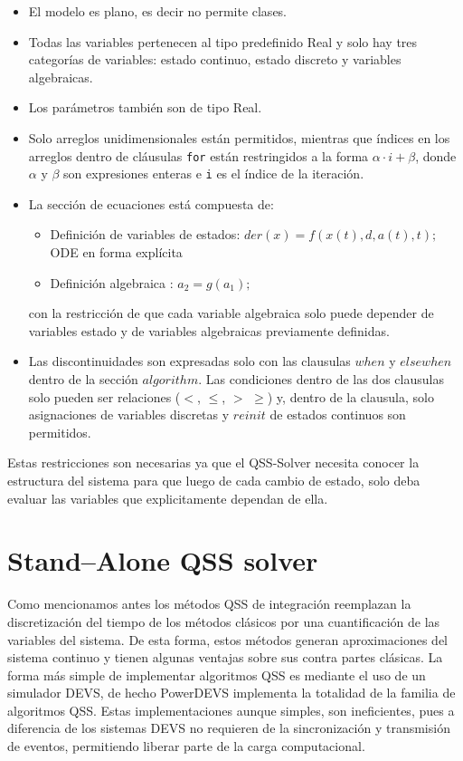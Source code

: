 	\begin{itemize}
	 \item El modelo es plano, es decir no permite clases.
	 \item Todas las variables pertenecen al tipo predefinido Real y solo hay tres categorías de variables: estado continuo, estado discreto y variables 
	algebraicas.
	 \item Los parámetros también son de tipo Real. 
	 \item 
     
    Solo arreglos unidimensionales están permitidos, mientras que índices en los arreglos dentro de cláusulas \texttt{for} están restringidos a la forma $\alpha \cdot i + \beta$, 
	donde $\alpha$ y $\beta$ son expresiones enteras e \texttt{i} es el índice de la iteración.
	 \item La sección de ecuaciones está compuesta de:
	 \begin{itemize}
		\item Definición de variables de estados: $der(x) =  f (x(t), d, a(t), t);$ ODE en forma explícita
		\item Definición algebraica : $a_2  = g(a_1);$
	 \end{itemize}
	 con la restricción de que cada variable algebraica solo puede depender de variables estado y de variables algebraicas previamente definidas.
	 
	 \item Las discontinuidades son expresadas solo con las clausulas $when$ y $elsewhen$ dentro de la sección $algorithm$. Las condiciones dentro de las dos 
	clausulas solo pueden ser relaciones ($<$, $\leqslant$, $>$ $\geqslant$) y, dentro de la clausula, solo asignaciones de variables discretas y $reinit$ 
	de estados continuos son permitidos.
	\end{itemize}

	Estas restricciones son necesarias ya que el QSS-Solver necesita conocer la estructura del sistema para que luego de cada cambio de estado, solo deba evaluar
	las variables que explicitamente dependan de ella.

\section{Stand–Alone QSS solver}
	Como mencionamos antes los métodos QSS de integración reemplazan la discretización del tiempo de los métodos clásicos por una cuantificación de las 
	variables del sistema. De esta forma, estos métodos generan aproximaciones del sistema continuo y tienen algunas ventajas sobre sus contra partes clásicas.
	La forma más simple de implementar algoritmos QSS es mediante el uso de un simulador DEVS, de hecho PowerDEVS implementa la totalidad de la familia de 
	algoritmos QSS. Estas implementaciones aunque simples, son ineficientes, pues a diferencia de los sistemas DEVS no requieren de la sincronización y 
	transmisión de eventos, permitiendo liberar parte de la carga computacional.

